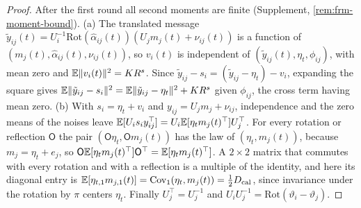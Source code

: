 \begin{proof}
After the first round all second moments are finite (Supplement, \cref{rem:frm-moment-bound}). (a) The translated message $\tilde y_{ij}(t)=U_i^{-1}\mathrm{Rot}(\hat\alpha_{ij}(t))(U_jm_j(t)+\nu_{ij}(t))$ is a function of $(m_j(t),\hat\alpha_{ij}(t),\nu_{ij}(t))$, so $v_i(t)$ is independent of $(\tilde y_{ij}(t),\eta_t,\phi_{ij})$, with mean zero and $\mathbb{E}\Vert v_i(t)\Vert^2=KR^s$. Since $\tilde y_{ij}-s_i=(\tilde y_{ij}-\eta_t)-v_i$, expanding the square gives $\mathbb{E}\Vert\tilde y_{ij}-s_i\Vert^2=\mathbb{E}\Vert\tilde y_{ij}-\eta_t\Vert^2+KR^s$ given $\phi_{ij}$, the cross term having mean zero. (b) With $s_i=\eta_t+v_i$ and $y_{ij}=U_jm_j+\nu_{ij}$, independence and the zero means of the noises leave $\mathbb{E}[U_is_iy_{ij}^\top]=U_i\mathbb{E}[\eta_tm_j(t)^\top]U_j^\top$. For every rotation or reflection $\mathsf O$ the pair $(\mathsf O\eta_t,\mathsf Om_j(t))$ has the law of $(\eta_t,m_j(t))$, because $m_j=\eta_t+e_j$, so $\mathsf O\mathbb{E}[\eta_tm_j(t)^\top]\mathsf O^\top=\mathbb{E}[\eta_tm_j(t)^\top]$. A $2\times2$ matrix that commutes with every rotation and with a reflection is a multiple of the identity, and here its diagonal entry is $\mathbb{E}[\eta_{t,1}m_{j,1}(t)]=\operatorname{Cov}_1(\eta_t,m_j(t))=\frac12D_{\mathrm{cal}}$, since invariance under the rotation by $\pi$ centers $\eta_t$. Finally $U_j^\top=U_j^{-1}$ and $U_iU_j^{-1}=\mathrm{Rot}(\vartheta_i-\vartheta_j)$.
\end{proof}

